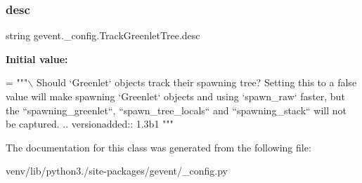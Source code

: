 \subsubsection{\texorpdfstring{desc}{desc}}
{\footnotesize\ttfamily string gevent.\+\_\+config.\+Track\+Greenlet\+Tree.\+desc\hspace{0.3cm}{\ttfamily [static]}}

{\bfseries Initial value\+:}
\begin{DoxyCode}
=  \textcolor{stringliteral}{"""\(\backslash\)}
\textcolor{stringliteral}{Should `Greenlet` objects track their spawning tree?}
\textcolor{stringliteral}{}
\textcolor{stringliteral}{Setting this to a false value will make spawning `Greenlet`}
\textcolor{stringliteral}{objects and using `spawn\_raw` faster, but the}
\textcolor{stringliteral}{``spawning\_greenlet``, ``spawn\_tree\_locals`` and ``spawning\_stack``}
\textcolor{stringliteral}{will not be captured.}
\textcolor{stringliteral}{}
\textcolor{stringliteral}{.. versionadded:: 1.3b1}
\textcolor{stringliteral}{"""}
\end{DoxyCode}


The documentation for this class was generated from the following file\+:\begin{DoxyCompactItemize}
\item 
venv/lib/python3./site-\/packages/gevent/\+\_\+config.\+py\end{DoxyCompactItemize}
